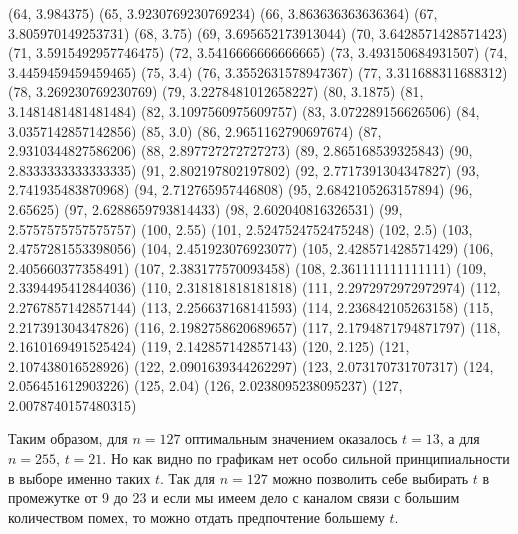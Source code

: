\documentclass[12pt]{article}
\begin{document}
{                (64, 3.984375)
                (65, 3.9230769230769234)
                (66, 3.863636363636364)
                (67, 3.805970149253731)
                (68, 3.75)
                (69, 3.695652173913044)
                (70, 3.6428571428571423)
                (71, 3.5915492957746475)
                (72, 3.5416666666666665)
                (73, 3.493150684931507)
                (74, 3.4459459459459465)
                (75, 3.4)
                (76, 3.3552631578947367)
                (77, 3.311688311688312)
                (78, 3.269230769230769)
                (79, 3.2278481012658227)
                (80, 3.1875)
                (81, 3.1481481481481484)
                (82, 3.1097560975609757)
                (83, 3.072289156626506)
                (84, 3.0357142857142856)
                (85, 3.0)
                (86, 2.9651162790697674)
                (87, 2.9310344827586206)
                (88, 2.897727272727273)
                (89, 2.865168539325843)
                (90, 2.8333333333333335)
                (91, 2.802197802197802)
                (92, 2.7717391304347827)
                (93, 2.741935483870968)
                (94, 2.712765957446808)
                (95, 2.6842105263157894)
                (96, 2.65625)
                (97, 2.6288659793814433)
                (98, 2.602040816326531)
                (99, 2.5757575757575757)
                (100, 2.55)
                (101, 2.5247524752475248)
                (102, 2.5)
                (103, 2.4757281553398056)
                (104, 2.451923076923077)
                (105, 2.428571428571429)
                (106, 2.405660377358491)
                (107, 2.383177570093458)
                (108, 2.361111111111111)
                (109, 2.3394495412844036)
                (110, 2.318181818181818)
                (111, 2.2972972972972974)
                (112, 2.2767857142857144)
                (113, 2.256637168141593)
                (114, 2.236842105263158)
                (115, 2.217391304347826)
                (116, 2.1982758620689657)
                (117, 2.1794871794871797)
                (118, 2.1610169491525424)
                (119, 2.142857142857143)
                (120, 2.125)
                (121, 2.107438016528926)
                (122, 2.0901639344262297)
                (123, 2.073170731707317)
                (124, 2.056451612903226)
                (125, 2.04)
                (126, 2.0238095238095237)
                (127, 2.0078740157480315)
            }

            Таким образом, для $n = 127$ оптимальным значением оказалось $t = 13$, а для $n = 255$, $t = 21$. Но как видно по графикам нет особо сильной принципиальности в выборе именно таких $t$. Так для $n = 127$ можно позволить себе выбирать $t$ в промежутке от 9 до 23 и если мы имеем дело с каналом связи с большим количеством помех, то можно отдать предпочтение большему $t$. \\
\end{document}
